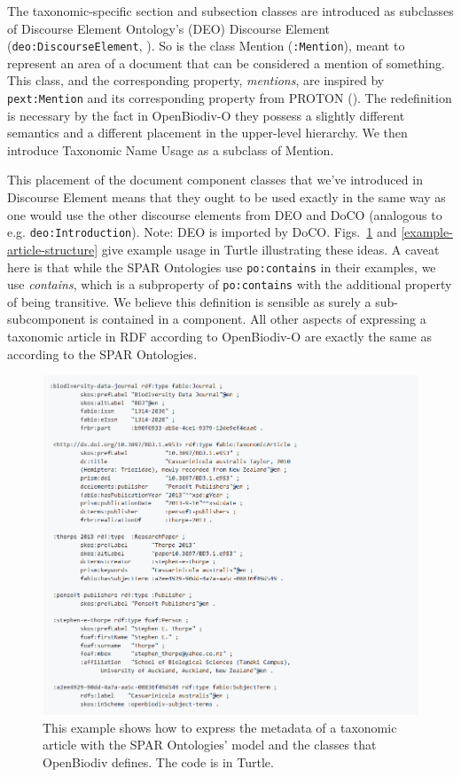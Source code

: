 The taxonomic-specific section and subsection classes are introduced as subclasses of Discourse Element Ontology's (DEO) Discourse Element ({\tt deo:DiscourseElement},  \cite{constantin_document_2016}). So is the class Mention ({\tt :Mention}), meant to represent an area of a document that can be considered a mention of something. This class, and the corresponding property, \emph{mentions}, are inspired by {\tt pext:Mention} and its corresponding property from PROTON (\cite{damova_mapping_2010}). The redefinition is necessary by the fact in OpenBiodiv-O they possess a slightly different semantics and a different placement in the upper-level hierarchy. We then introduce Taxonomic Name Usage as a subclass of Mention.

This placement of the document component classes that we've introduced in Discourse Element means that they ought to be used exactly in the same way as one would use the other discourse elements from DEO and DoCO (analogous to e.g. {\tt deo:Introduction}). Note: DEO is imported by DoCO. Figs.~\ref{example-article-metadata} and \ref{example-article-structure} give example usage in Turtle illustrating these ideas. A caveat here is that while the SPAR Ontologies use {\tt po:contains} in their examples, we use \emph{contains}, which is a subproperty of {\tt po:contains} with the additional property of being transitive. We believe this definition is sensible as surely a sub-subcomponent is contained in a component. All other aspects of expressing a taxonomic article in RDF according to OpenBiodiv-O are exactly the same as according to the SPAR Ontologies.

\begin{figure}[h!]
	\centering
	\includegraphics[width=\textwidth]{Figures/example-article-metadata}
	\decoRule
  \caption[Example article metadata.]{This example shows how to express the metadata of a taxonomic article with the SPAR Ontologies' model and the classes that OpenBiodiv defines. The code is in Turtle.}
  \label{example-article-metadata}
\end{figure}

